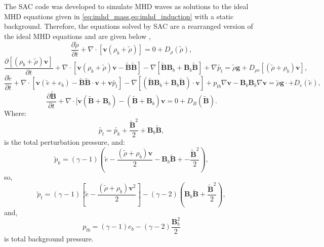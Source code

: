 \documentclass[a4paper,12pt,fourier,authoryear,custommargin]{Classes/PhDThesisPSnPDF}
\begin{document}
The SAC code was developed to simulate MHD waves as solutions to the ideal MHD equations given in \cref{eq:imhd_mass,eq:imhd_induction} with a static background.
Therefore, the equations solved by SAC are a rearranged version of the ideal MHD equations and are given below \citep[taken from][]{shelyag2008},
\begin{equation}
\frac{\partial\tilde{\rho}}{\partial t}+\nabla\cdot[\mathbf{v}(\rho_{b}+\tilde{\rho})]=0+D_{\rho}(\tilde{\rho}),
\end{equation}
\begin{equation}
\frac{\partial[(\rho_{b}+\tilde{\rho})\mathbf{v}]}{\partial t}+\nabla\cdot[\mathbf{v}(\rho_{b}+\tilde{\rho})\mathbf{v}-\mathbf{\tilde{B}\tilde{B}}]-\nabla[\mathbf{\tilde{B}}\mathbf{B}_{b}+\mathbf{B}_{b}\mathbf{\tilde{B}}]+\nabla\tilde{p_{t}}=\tilde{\rho}\mathbf{g}+D_{\rho v}[(\tilde{\rho}+\rho_{b})\mathbf{v}],
\end{equation}
\begin{equation}
\frac{\partial\tilde{e}}{\partial t}+\nabla\cdot[\mathbf{v}(\tilde{e}+e_{b})-\mathbf{\tilde{B}\tilde{B}}\cdot\mathbf{v}+\mathbf{v}\tilde{p_{t}}]-\nabla[(\mathbf{\tilde{B}B}_{b}+\mathbf{B}_{b}\mathbf{\tilde{B}})\cdot\mathbf{v}]+p_{tb}\nabla\mathbf{v}-\mathbf{B}_{b}\mathbf{B}_{b}\nabla\mathbf{v}=\tilde{\rho}\mathbf{g}\cdot+D_{e}(\tilde{e}),
\end{equation}
\begin{equation}
\frac{\partial\mathbf{\tilde{B}}}{\partial t}+\nabla\cdot[\mathbf{v}(\mathbf{\tilde{B}}+\mathbf{B}_{b})-(\mathbf{\tilde{B}}+\mathbf{B}_{b})\mathbf{v}=0+D_{B}(\mathbf{\tilde{B}}).
\end{equation}
Where:
\begin{equation}
\tilde{p_{t}}=\tilde{p_{k}}+\frac{\tilde{\mathbf{B}}^{2}}{2}+\mathbf{B}_{b}\mathbf{\tilde{B}},
\end{equation}
is the total perturbation pressure, and: 
\begin{equation}
\tilde{p}_{k}=(\gamma-1)\left(\tilde{e}-\frac{(\tilde{\rho}+\rho_{b})\mathbf{v}}{2}-\mathbf{B}_b\mathbf{\tilde{B}}+-\frac{\tilde{\mathbf{B}}^{2}}{2}\right),
\end{equation}
so,
\begin{equation}
\tilde{p}_{t}=(\gamma-1)\left[\tilde{e}-\frac{(\tilde{\rho}+\rho_{b})\mathbf{v}^{2}}{2}\right]-(\gamma-2)\left(\mathbf{B}_{b}\mathbf{\tilde{B}}+\frac{\tilde{\mathbf{B}}^{2}}{2}\right),
\end{equation}
and,
\begin{equation}
p_{tb}=(\gamma-1)e_{b}-(\gamma-2)\frac{\mathbf{B}_{b}^{2}}{2}
\end{equation}
is total background pressure.
\end{document}

